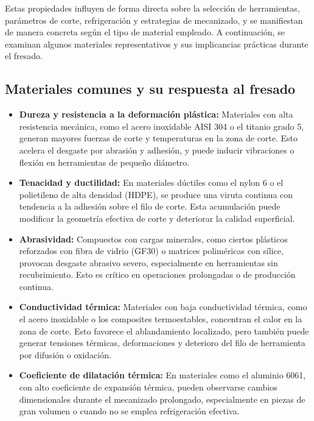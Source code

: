 {Estas propiedades influyen de forma directa sobre la selección de herramientas, parámetros de corte, refrigeración y estrategias de mecanizado, y se manifiestan de manera concreta según el tipo de material empleado. A continuación, se examinan algunos materiales representativos y sus implicancias prácticas durante el fresado.

\subsection{Materiales comunes y su respuesta al fresado}

\begin{itemize}
	\item \textbf{Dureza y resistencia a la deformación plástica:} Materiales con alta resistencia mecánica, como el acero inoxidable AISI 304 o el titanio grado 5, generan mayores fuerzas de corte y temperaturas en la zona de corte. Esto acelera el desgaste por abrasión y adhesión, y puede inducir vibraciones o flexión en herramientas de pequeño diámetro.
	
	\item \textbf{Tenacidad y ductilidad:} En materiales dúctiles como el nylon 6 o el polietileno de alta densidad (HDPE), se produce una viruta continua con tendencia a la adhesión sobre el filo de corte. Esta acumulación puede modificar la geometría efectiva de corte y deteriorar la calidad superficial.
	
	\item \textbf{Abrasividad:} Compuestos con cargas minerales, como ciertos plásticos reforzados con fibra de vidrio (GF30) o matrices poliméricas con sílice, provocan desgaste abrasivo severo, especialmente en herramientas sin recubrimiento. Esto es crítico en operaciones prolongadas o de producción continua.
	
	\item \textbf{Conductividad térmica:} Materiales con baja conductividad térmica, como el acero inoxidable o los composites termoestables, concentran el calor en la zona de corte. Esto favorece el ablandamiento localizado, pero también puede generar tensiones térmicas, deformaciones y deterioro del filo de herramienta por difusión o oxidación.
	
	\item \textbf{Coeficiente de dilatación térmica:} En materiales como el aluminio 6061, con alto coeficiente de expansión térmica, pueden observarse cambios dimensionales durante el mecanizado prolongado, especialmente en piezas de gran volumen o cuando no se emplea refrigeración efectiva.
\end{itemize}

}
